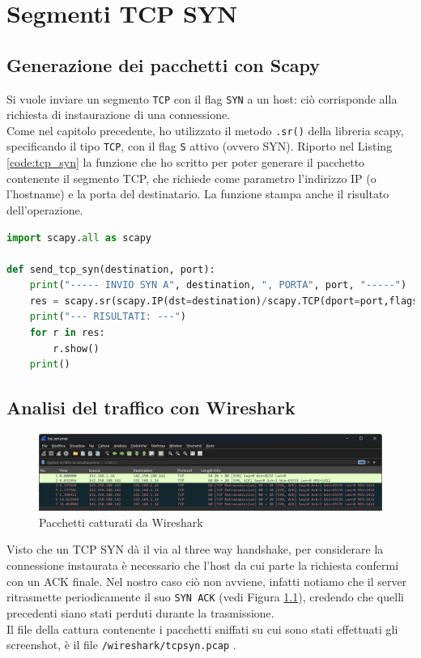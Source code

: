 \documentclass[12pt,a4paper]{report}
\begin{document}
\chapter{Segmenti TCP SYN}

\section{Generazione dei pacchetti con Scapy}
Si vuole inviare un segmento \texttt{TCP} con il flag \texttt{SYN} a un host: ciò corrisponde alla richiesta di instaurazione di una connessione. \\
Come nel capitolo precedente, ho utilizzato il metodo \texttt{.sr()} della libreria scapy, specificando il tipo \texttt{TCP}, con il flag \texttt{S} attivo (ovvero SYN). Riporto nel Listing \ref{code:tcp_syn} la funzione che ho scritto per poter generare il pacchetto contenente il segmento TCP, che richiede come parametro l'indirizzo IP (o l'hostname) e la porta del destinatario. La funzione stampa anche il risultato dell'operazione.

\begin{lstlisting}[language=Python, caption={Funzione python per la generazione di un segmento \texttt{TCP} con flag \texttt{SYN} attivo}, label={code:tcp_syn}]
import scapy.all as scapy

def send_tcp_syn(destination, port):
    print("----- INVIO SYN A", destination, ", PORTA", port, "-----")
    res = scapy.sr(scapy.IP(dst=destination)/scapy.TCP(dport=port,flags="S"), timeout=4)
    print("--- RISULTATI: ---")
    for r in res:
        r.show()
    print()
\end{lstlisting}

\section{Analisi del traffico con Wireshark}
\begin{figure}[H]
	\centering
	\includegraphics[width=1\textwidth]{tcp_syn_capture}
 	\caption{Pacchetti catturati da Wireshark}
	\label{tcp_syn_capture}
\end{figure}
Visto che un TCP SYN dà il via al three way handshake, per considerare la connessione instaurata è necessario che l'host da cui parte la richiesta confermi con un ACK finale. Nel nostro caso ciò non avviene, infatti notiamo che il server ritrasmette periodicamente il suo \texttt{SYN ACK} (vedi Figura \ref{tcp_syn_capture}), credendo che quelli precedenti siano stati perduti durante la trasmissione. \\
Il file della cattura contenente i pacchetti sniffati su cui sono stati effettuati gli screenshot, è il file \texttt{/wireshark/tcp{\textunderscore}syn.pcap} .
\end{document}
